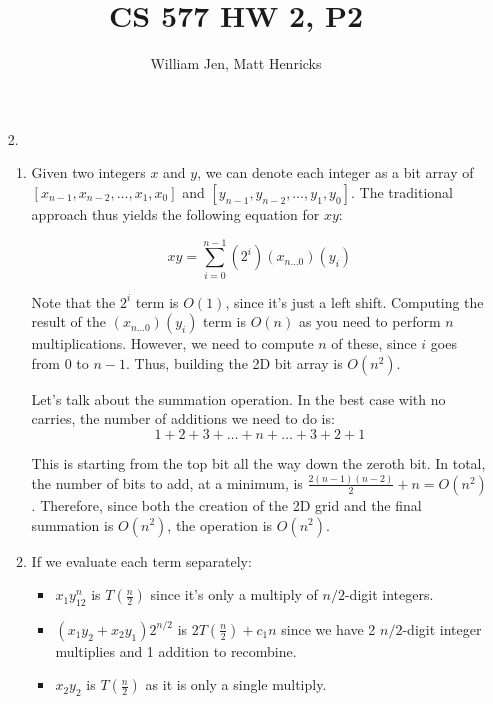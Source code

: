 \documentclass{article}
\title{CS 577 HW 2, P2}
\author{William Jen, Matt Henricks}
\date{}
\begin{document}
\maketitle

\begin{enumerate}
    \item[2.]
        \begin{enumerate}
            \item Given two integers $x$ and $y$, we can denote each integer as a bit array of 
            $\left[x_{n-1}, x_{n-2}, \ldots, x_1, x_0 \right]$ and
            $\left[y_{n-1}, y_{n-2}, \ldots, y_1, y_0 \right]$.
            The traditional approach thus yields the following equation for $xy$:
            
            \begin{equation*}
                xy = \sum\limits_{i = 0}^{n-1} \left(2^i\right)\left(x_{n\ldots0}\right)\left(y_i\right)
            \end{equation*}
            
            Note that the $2^i$ term is $O\left(1\right)$, since it's just a left shift.
            Computing the result of the $\left(x_{n\ldots0}\right)\left(y_i\right)$ term is $O\left(n\right)$
            as you need to perform $n$ multiplications. However, we need to compute $n$ of these, since 
            $i$ goes from $0$ to $n-1$. Thus, building the 2D bit array is $O\left(n^2\right)$.
            
            Let's talk about the summation operation. In the best case with no carries, the number of additions
            we need to do is:
            \begin{equation*}
                1 + 2 + 3 + \ldots + n + \ldots + 3 + 2 + 1
            \end{equation*}
            
            This is starting from the top bit all the way down the zeroth bit. In total, the number of bits to add,
            at a minimum, is $\frac{2\left(n-1\right)\left(n-2\right)}{2} + n = O\left(n^2\right)$. Therefore, since both the 
            creation of the 2D grid and the final summation is $O\left(n^2\right)$, the operation is 
            $O\left(n^2\right)$.
            
            \item If we evaluate each term separately:
                \begin{itemize}
                    \item $x_1y_12^n$ is $T\left(\frac{n}{2}\right)$ since it's only a multiply of $n/2$-digit integers.
                    \item $\left(x_1y_2 + x_2y_1\right)2^{n/2}$ is $2T\left(\frac{n}{2}\right) + c_1n$ since
                        we have 2 $n/2$-digit integer multiplies and 1 addition to recombine.
                    \item $x_2y_2$ is $T\left(\frac{n}{2}\right)$ as it is only a single multiply.
                \end{itemize}
            

\end{enumerate}
\end{enumerate}
\end{document}
